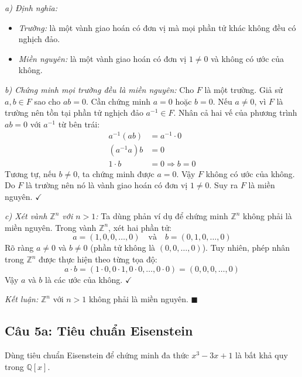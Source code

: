 \begin{solution}
\textit{a) Định nghĩa:}
\begin{itemize}
    \item \textit{Trường:} là một vành giao hoán có đơn vị mà mọi phần tử khác không đều có nghịch đảo.
    \item \textit{Miền nguyên:} là một vành giao hoán có đơn vị $1 \neq 0$ và không có ước của không.
\end{itemize}

\textit{b) Chứng minh mọi trường đều là miền nguyên:}
Cho $F$ là một trường. Giả sử $a, b \in F$ sao cho $ab = 0$.
Cần chứng minh $a = 0$ hoặc $b = 0$.
Nếu $a \neq 0$, vì $F$ là trường nên tồn tại phần tử nghịch đảo $a^{-1} \in F$.
Nhân cả hai vế của phương trình $ab = 0$ với $a^{-1}$ từ bên trái:
\begin{align*}
    a^{-1}(ab) &= a^{-1} \cdot 0 \\
    (a^{-1}a)b &= 0 \\
    1 \cdot b &= 0 \Rightarrow b = 0
\end{align*}
Tương tự, nếu $b \neq 0$, ta chứng minh được $a = 0$.
Vậy $F$ không có ước của không. Do $F$ là trường nên nó là vành giao hoán có đơn vị $1 \neq 0$.
Suy ra $F$ là miền nguyên. $\checkmark$

\textit{c) Xét vành $\mathbb{Z}^n$ với $n > 1$:}
Ta dùng phản ví dụ để chứng minh $\mathbb{Z}^n$ không phải là miền nguyên.
Trong vành $\mathbb{Z}^n$, xét hai phần tử:
\[
    a = (1, 0, 0, \dots, 0) \quad \text{và} \quad b = (0, 1, 0, \dots, 0)
\]
Rõ ràng $a \neq 0$ và $b \neq 0$ (phần tử không là $(0, 0, \dots, 0)$).
Tuy nhiên, phép nhân trong $\mathbb{Z}^n$ được thực hiện theo từng tọa độ:
\[
    a \cdot b = (1 \cdot 0, 0 \cdot 1, 0 \cdot 0, \dots, 0 \cdot 0) = (0, 0, 0, \dots, 0)
\]
Vậy $a$ và $b$ là các ước của không. $\checkmark$

\textit{Kết luận:} $\mathbb{Z}^n$ với $n > 1$ không phải là miền nguyên. $\blacksquare$
\end{solution}

\subsection*{Câu 5a: Tiêu chuẩn Eisenstein}

\begin{questionbox}
Dùng tiêu chuẩn Eisenstein để chứng minh đa thức $x^3 - 3x + 1$ là bất khả quy trong $\mathbb{Q}[x]$.
\end{questionbox}

